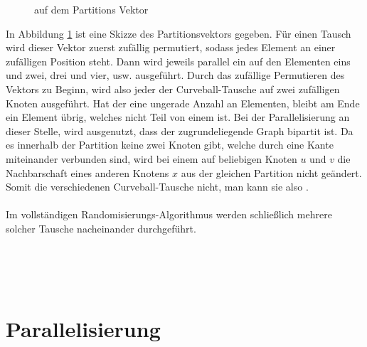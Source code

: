 \begin{figure}[h]
\centering
  \caption{\gc auf dem Partitions Vektor}
  \label{fig:global_curveball_trade_vector}
  
\end{figure}
%
%
%
In Abbildung \ref{fig:global_curveball_trade_vector} ist eine Skizze des Partitionsvektors gegeben.
Für einen \gc Tausch wird dieser Vektor zuerst zufällig permutiert, sodass jedes Element an einer zufälligen
Position steht. Dann wird jeweils parallel ein \ct auf den Elementen eins und zwei, drei und vier, usw. ausgeführt.
Durch das zufällige Permutieren des Vektors zu Beginn, wird also jeder der Curveball-Tausche auf zwei zufälligen
Knoten ausgeführt. Hat der \partvek eine ungerade Anzahl an Elementen, bleibt am Ende ein Element übrig, 
welches nicht Teil von einem \ct ist. Bei der Parallelisierung an dieser Stelle, wird ausgenutzt, dass 
der zugrundeliegende Graph bipartit ist. Da es innerhalb der Partition keine zwei Knoten gibt, welche  
durch eine Kante miteinander verbunden sind, wird bei einem \ct auf beliebigen Knoten $u$ und $v$ 
die Nachbarschaft eines anderen Knotens $x$  aus der gleichen Partition nicht geändert. Somit
 die verschiedenen Curveball-Tausche nicht, man kann sie also . 
\\
\\
Im vollständigen Randomisierungs-Algorithmus werden schließlich mehrere solcher \gc Tausche nacheinander
durchgeführt.



~\\
\\
\\











\section{Parallelisierung}

